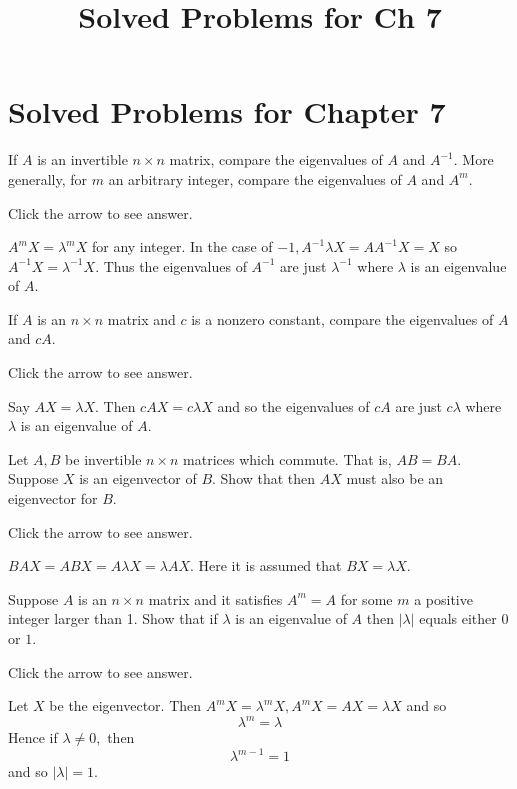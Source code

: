 \documentclass{ximera}
\title{Solved Problems for Ch 7} \license{CC BY-NC-SA 4.0}
\begin{document}
\begin{abstract}
\end{abstract}
\maketitle

\section*{Solved Problems for Chapter 7}


\begin{problem}\label{prb:8.1} If $A$ is an invertible $n\times n$ matrix, compare the eigenvalues of
$A$ and $A^{-1}$. More generally, for $m$ an arbitrary integer, compare the
eigenvalues of $A$ and $A^{m}$.

Click the arrow to see answer.
\begin{expandable}
$A^{m}X=\lambda ^{m}X$ for
any integer. In the case of $-1,A^{-1}\lambda X=AA^{-1}X=X$
so $A^{-1}X =\lambda ^{-1}X$. Thus the eigenvalues of $A^{-1}$ are just $\lambda ^{-1}$ where $\lambda $ is an eigenvalue of $A$.
\end{expandable}
\end{problem}

\begin{problem}\label{prb:8.2} If $A$ is an $n\times n$ matrix and $c$ is a nonzero constant, compare
the eigenvalues of $A$ and $cA$. 

Click the arrow to see answer.
\begin{expandable}
Say $AX=\lambda X.$ Then $
cAX=c\lambda X$ and so the eigenvalues of $cA$ are just $
c\lambda $ where $\lambda $ is an eigenvalue of $A$.
\end{expandable}
\end{problem}

\begin{problem}\label{prb:8.3} Let $A,B$ be invertible $n\times n$ matrices which commute. That is, $AB=BA$. Suppose $X$ is an eigenvector of $B$. Show that then
$AX$ must also be an eigenvector for $B$.

Click the arrow to see answer.
\begin{expandable}
 $BAX=ABX
=A\lambda X=\lambda AX$. Here it is assumed that $BX=\lambda X$.
\end{expandable}
\end{problem}

\begin{problem}\label{prb:8.4} Suppose $A$ is an $n\times n$ matrix and it satisfies $A^{m}=A$ for
some $m$ a positive integer larger than 1. Show that if $\lambda $ is an
eigenvalue of $A$ then $\left\vert \lambda \right\vert $ equals either 0 or $
1$. 

Click the arrow to see answer.
\begin{expandable}
Let $X$ be the eigenvector. Then $A^{m}X=\lambda ^{m}
X,A^{m}X=AX=\lambda X$ and so
\[
\lambda ^{m}=\lambda
\]
Hence if $\lambda \neq 0,$ then
\[
\lambda ^{m-1}=1
\]
and so $\left\vert \lambda \right\vert =1.$
\end{expandable}
\end{problem}
\end{document}
